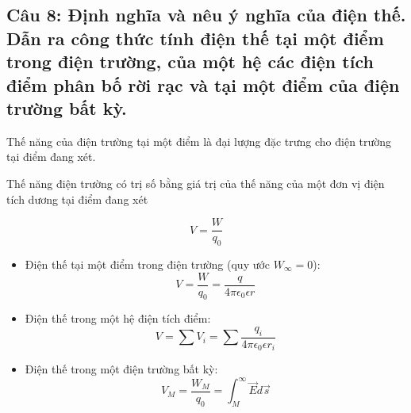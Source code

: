 \subsection[Câu 8]{Câu 8: Định nghĩa và nêu ý nghĩa của điện thế. Dẫn ra công thức tính điện thế tại một điểm trong điện trường, của một hệ các điện tích điểm phân bố rời rạc và tại một điểm của điện trường bất kỳ.}

Thế năng của điện trường tại một điểm là đại lượng đặc trưng cho điện trường tại điểm đang xét.

Thế năng điện trường có trị số bằng giá trị của thế năng của một đơn vị điện tích dương tại điểm đang xét 

\begin{equation*}
V = \frac{W}{q_0}
\end{equation*}

\begin{itemize}
  \item Điện thế tại một điểm trong điện trường (quy ước $W_\infty = 0$): 
  \begin{equation*}
    V = \frac{W}{q_0} = \frac{q}{4\pi\epsilon_0\epsilon r}
  \end{equation*}
  \item Điện thế trong một hệ điện tích điểm:
  \begin{equation*}
    V = \sum V_i = \sum \frac{q_i}{4\pi\epsilon_0\epsilon r_i}
  \end{equation*}
  \item Điện thế trong một điện trường bất kỳ:
  \begin{equation*}
    V_M = \frac{W_M}{q_0} = \int_{M}^{\infty} \vec{E}d\vec{s}
  \end{equation*}
\end{itemize}
